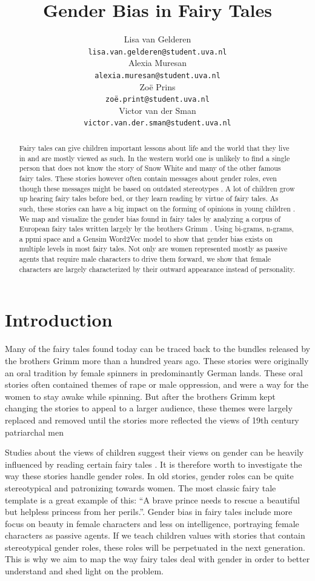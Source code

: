 \documentclass[11pt]{article}
\title{Gender Bias in Fairy Tales}
\author{
    Lisa van Gelderen \\
  {\tt lisa.van.gelderen@student.uva.nl} \\
    Alexia Muresan \\
  {\tt alexia.muresan@student.uva.nl} \\
    Zoë Prins \\
  {\tt zoë.print@student.uva.nl} \\
    Victor van der Sman \\
  {\tt victor.van.der.sman@student.uva.nl} \\}
\date{}
\begin{document}
\maketitle
\begin{abstract}
  Fairy tales can give children important lessons about life and the world that they live in and are mostly viewed as such. In the western world one is unlikely to find a single person that does not know the story of Snow White and many of the other famous fairy tales. These stories however often contain messages about gender roles, even though these messages might be based on outdated stereotypes \cite{Lieberman}. A lot of children grow up hearing fairy tales before bed, or they learn reading by virtue of fairy tales. As such, these stories can have a big impact on the forming of opinions in young children \cite{Wardetzky}. We map and visualize the gender bias found in fairy tales by analyzing a corpus of European fairy tales written largely by the brothers Grimm \cite{Aho:10}. Using bi-grams, n-grams, a ppmi space and a Gensim Word2Vec model to show that gender bias exists on multiple levels in most fairy tales. Not only are women represented mostly as passive agents that require male characters to drive them forward, we show that female characters are largely characterized by their outward appearance instead of personality. 
\end{abstract}


\section{Introduction}

Many of the fairy tales found today can be traced back to the bundles released by the brothers Grimm more than a hundred years ago. These stories were originally an oral tradition by female spinners in predominantly German lands. These oral stories often contained themes of rape or male oppression, and were a way for the women to stay awake while spinning. But after the brothers Grimm kept changing the stories to appeal to a larger audience, these themes were largely replaced and removed until the stories more reflected the views of 19th century patriarchal men \cite{Marshall}

Studies about the views of children suggest their views on gender can be heavily influenced by reading certain fairy tales \cite{Wardetzky}. It is therefore worth to investigate the way these stories handle gender roles. In old stories, gender roles can be quite stereotypical and patronizing towards women. The most classic fairy tale template is a great example of this: “A brave prince needs to rescue a beautiful but helpless princess from her perils.”. Gender bias in fairy tales include more focus on beauty in female characters and less on intelligence, portraying female characters as passive agents. If we teach children values with stories that contain stereotypical gender roles, these roles will be perpetuated in the next generation. This is why we aim to map the way fairy tales deal with gender in order to better understand and shed light on the problem. 
 
\end{document}
